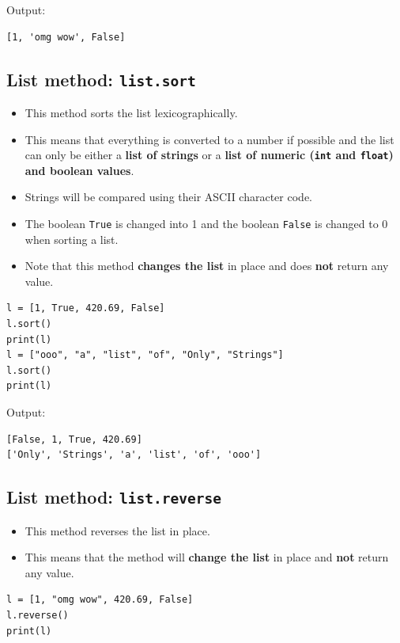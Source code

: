 \documentclass[11pt]{article}
\begin{document}
 \noindent Output:

\begin{verbatim}
[1, 'omg wow', False]
\end{verbatim}

\subsection{List method: \texttt{list.sort}}
\label{sec:org5ffc00f}
\begin{itemize}
\item This method sorts the list lexicographically.
\item This means that everything is converted to a number if possible and the list can only be either a \textbf{list of strings} or a \textbf{list of numeric (\texttt{int} and \texttt{float}) and boolean values}.
\item Strings will be compared using their ASCII character code.
\item The boolean \texttt{True} is changed into 1 and the boolean \texttt{False} is changed to 0 when sorting a list.
\item Note that this method \textbf{changes the list} in place and does \textbf{not} return any value.
\end{itemize}

\begin{verbatim}
l = [1, True, 420.69, False]
l.sort()
print(l)
l = ["ooo", "a", "list", "of", "Only", "Strings"]
l.sort()
print(l)
\end{verbatim}

 \noindent Output:

\begin{verbatim}
[False, 1, True, 420.69]
['Only', 'Strings', 'a', 'list', 'of', 'ooo']
\end{verbatim}

\subsection{List method: \texttt{list.reverse}}
\label{sec:orgc8f6b02}
\begin{itemize}
\item This method reverses the list in place.
\item This means that the method will \textbf{change the list} in place and \textbf{not} return any value.
\end{itemize}
\begin{verbatim}
l = [1, "omg wow", 420.69, False]
l.reverse()
print(l)
\end{verbatim}
\end{document}
